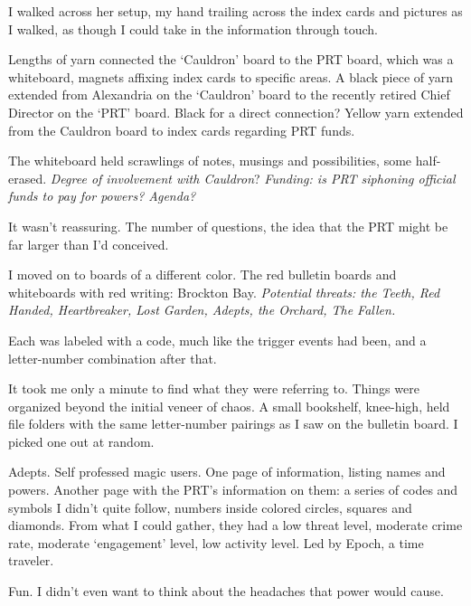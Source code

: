 I walked across her setup, my hand trailing across the index cards and pictures as I walked, as though I could take in the information through touch.



Lengths of yarn connected the `Cauldron' board to the PRT board, which was a whiteboard, magnets affixing index cards to specific areas.  A black piece of yarn extended from Alexandria on the `Cauldron' board to the recently retired Chief Director on the `PRT' board.  Black for a direct connection?  Yellow yarn extended from the Cauldron board to index cards regarding PRT funds.



The whiteboard held scrawlings of notes, musings and possibilities, some half-erased.  \emph{Degree of involvement with Cauldron}?  \emph{Funding: is PRT siphoning official funds to pay for powers?  Agenda?}



It wasn't reassuring.  The number of questions, the idea that the PRT might be far larger than I'd conceived.



I moved on to boards of a different color.  The red bulletin boards and whiteboards with red writing: Brockton Bay.  \emph{Potential threats: the Teeth, Red Handed, Heartbreaker, Lost Garden, Adepts, the Orchard, The Fallen.}



Each was labeled with a code, much like the trigger events had been, and a letter-number combination after that.



It took me only a minute to find what they were referring to.  Things were organized beyond the initial veneer of chaos.  A small bookshelf, knee-high, held file folders with the same letter-number pairings as I saw on the bulletin board.  I picked one out at random.



Adepts.  Self professed magic users.  One page of information, listing names and powers.  Another page with the PRT's information on them: a series of codes and symbols I didn't quite follow, numbers inside colored circles, squares and diamonds.  From what I could gather, they had a low threat level, moderate crime rate, moderate `engagement' level, low activity level.  Led by Epoch, a time traveler.



Fun.  I didn't even want to think about the headaches that power would cause.



